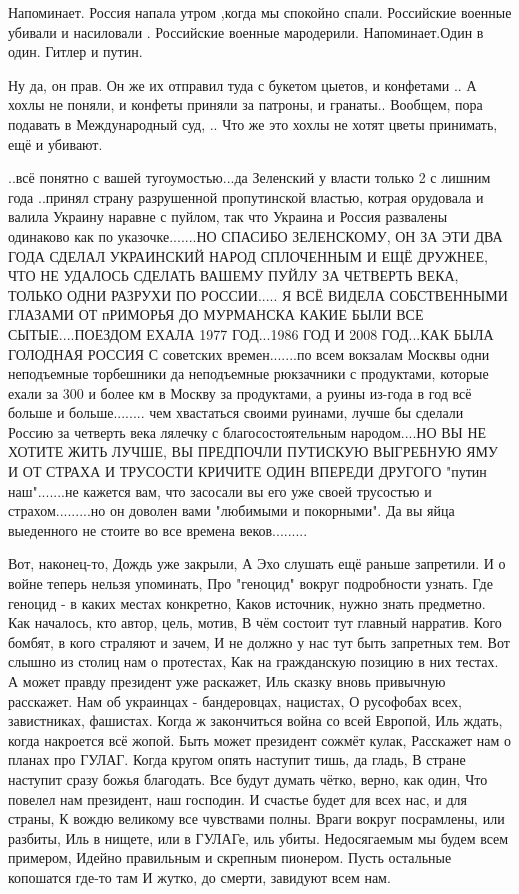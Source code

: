 Напоминает. Россия напала утром ,когда мы спокойно спали.
Российские военные убивали и насиловали .
Российские военные мародерили. Напоминает.Один в один. Гитлер и путин.

Ну да, он прав.
Он же их отправил туда с букетом цыетов, и конфетами ..
А хохлы не поняли, и конфеты приняли за патроны, и гранаты..
Вообщем, пора подавать в Международный суд, ..
Что же это хохлы не хотят цветы принимать, ещё и убивают.

..всё понятно с вашей тугоумостью...да Зеленский у власти только 2 с лишним
года ..принял страну разрушенной пропутинской властью, котрая орудовала и
валила Украину наравне с пуйлом, так что Украина и Россия развалены одинаково
как по указочке.......НО СПАСИБО ЗЕЛЕНСКОМУ, ОН ЗА ЭТИ ДВА ГОДА СДЕЛАЛ
УКРАИНСКИЙ НАРОД СПЛОЧЕННЫМ И ЕЩЁ ДРУЖНЕЕ, ЧТО НЕ УДАЛОСЬ СДЕЛАТЬ ВАШЕМУ ПУЙЛУ
ЗА ЧЕТВЕРТЬ ВЕКА, ТОЛЬКО ОДНИ РАЗРУХИ ПО РОССИИ..... Я ВСЁ ВИДЕЛА СОБСТВЕННЫМИ
ГЛАЗАМИ ОТ пРИМОРЬЯ ДО МУРМАНСКА КАКИЕ БЫЛИ ВСЕ СЫТЫЕ....ПОЕЗДОМ ЕХАЛА 1977
ГОД...1986 ГОД И 2008 ГОД...КАК БЫЛА ГОЛОДНАЯ РОССИЯ С советских
времен.......по всем вокзалам Москвы одни неподъемные торбешники да неподъемные
рюкзачники с продуктами, которые ехали за 300 и более км в Москву за
продуктами, а руины из-года в год всё больше и больше........ чем хвастаться
своими руинами, лучше бы сделали Россию за четверть века лялечку с
благосостоятельным народом....НО ВЫ НЕ ХОТИТЕ ЖИТЬ ЛУЧШЕ, ВЫ ПРЕДПОЧЛИ ПУТИСКУЮ
ВЫГРЕБНУЮ ЯМУ И ОТ СТРАХА И ТРУСОСТИ КРИЧИТЕ ОДИН ВПЕРЕДИ ДРУГОГО "путин
наш".......не кажется вам, что засосали вы его уже своей трусостью и
страхом.........но он доволен вами "любимыми и покорными". Да вы яйца
выеденного не стоите во все времена веков.........

Вот, наконец-то, Дождь уже закрыли,
А Эхо слушать ещё раньше запретили.
И о войне теперь нельзя упоминать,
Про "геноцид" вокруг подробности узнать.
Где геноцид - в каких местах конкретно,
Каков источник, нужно знать предметно.
Как началось, кто автор, цель, мотив,
В чём состоит тут главный нарратив.
Кого бомбят, в кого страляют и зачем,
И не должно у нас тут быть запретных тем.
Вот слышно из столиц нам о протестах,
Как на гражданскую позицию в них тестах.
А может правду президент уже раскажет,
Иль сказку вновь привычную расскажет.
Нам об украинцах - бандеровцах, нацистах,
О русофобах всех, завистниках, фашистах.
Когда ж закончиться война со всей Европой,
Иль ждать, когда накроется всё жопой.
Быть может президент сожмёт кулак,
Расскажет нам о планах про ГУЛАГ.
Когда кругом опять наступит тишь, да гладь,
В стране наступит сразу божья благодать.
Все будут думать чётко, верно, как один,
Что повелел нам президент, наш господин.
И счастье будет для всех нас, и для страны,
К вождю великому все чувствами полны.
Враги вокруг посрамлены, или разбиты,
Иль в нищете, или в ГУЛАГе, иль убиты.
Недосягаемым мы будем всем примером,
Идейно правильным и скрепным пионером.
Пусть остальные копошатся где-то там
И жутко, до смерти, завидуют всем нам.

